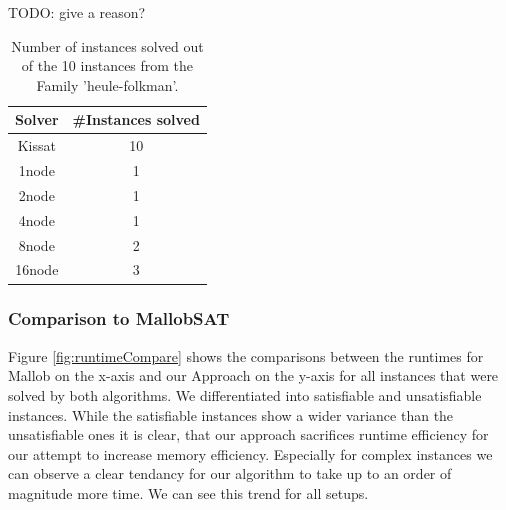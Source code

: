 \documentclass[12pt,a4paper,twoside]{scrartcl}
\numberwithin{equation}{section}
\begin{document}
TODO: give a reason?

\begin{table}
  \center
  \begin{tabular}{ c|c }
    Solver  & \#Instances solved\\
    \hline
    Kissat  & 10\\
    \hline
    1node   & 1\\
    \hline
    2node   & 1\\
    \hline
    4node   & 1\\
    \hline
    8node   & 2\\
    \hline
    16node  & 3
  \end{tabular}
  \caption{Number of instances solved out of the 10 instances from the Family 'heule-folkman'.}
  \label{tab:heuleFolkman}
\end{table}

\subsubsection{Comparison to MallobSAT}

Figure \ref{fig:runtimeCompare} shows the comparisons between the runtimes for Mallob on the x-axis and our Approach on the y-axis for all instances that were solved by both algorithms. We differentiated into satisfiable and unsatisfiable instances. While the satisfiable instances show a wider variance than the unsatisfiable ones it is clear, that our approach sacrifices runtime efficiency for our attempt to increase memory efficiency. Especially for complex instances we can observe a clear tendancy for our algorithm to take up to an order of magnitude more time. We can see this trend for all setups.
\end{document}

